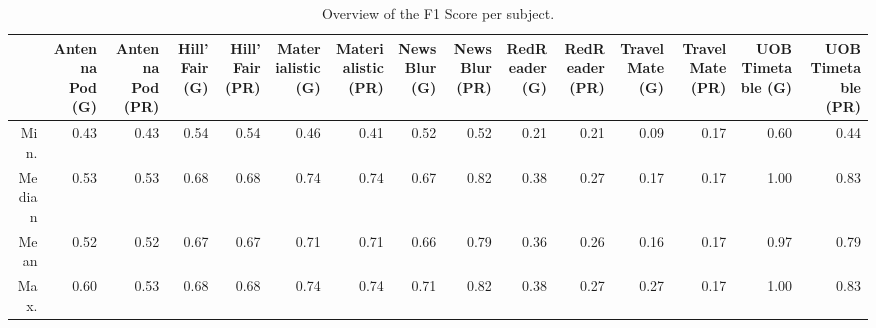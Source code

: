 \begin{table}[ht]
\centering
\begin{tabular}{rrrrrrrrrrrrrrr}
  \hline
 & Antenna Pod (G) & Antenna Pod (PR) & Hill'Fair (G) & Hill'Fair (PR) & Materialistic (G) & Materialistic (PR) & NewsBlur (G) & NewsBlur (PR) & RedReader (G) & RedReader (PR) & Travel Mate (G) & Travel Mate (PR) & UOB Timetable (G) & UOB Timetable (PR) \\ 
  \hline
Min. & 0.43 & 0.43 & 0.54 & 0.54 & 0.46 & 0.41 & 0.52 & 0.52 & 0.21 & 0.21 & 0.09 & 0.17 & 0.60 & 0.44 \\ 
  Median & 0.53 & 0.53 & 0.68 & 0.68 & 0.74 & 0.74 & 0.67 & 0.82 & 0.38 & 0.27 & 0.17 & 0.17 & 1.00 & 0.83 \\ 
  Mean & 0.52 & 0.52 & 0.67 & 0.67 & 0.71 & 0.71 & 0.66 & 0.79 & 0.36 & 0.26 & 0.16 & 0.17 & 0.97 & 0.79 \\ 
  Max. & 0.60 & 0.53 & 0.68 & 0.68 & 0.74 & 0.74 & 0.71 & 0.82 & 0.38 & 0.27 & 0.27 & 0.17 & 1.00 & 0.83 \\ 
   \hline
\end{tabular}
\caption{Overview of the F1 Score per subject.} 
\label{tab:results:rq4:summary:subject:f1_score}
\end{table}
